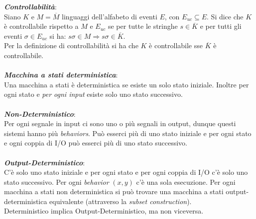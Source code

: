 \documentclass[a4paper, notitlepage, 10pt]{report}
\begin{document}
\noindent
\textit{\textbf{Controllabilità}}:\\
Siano $K$ e $M = \overline{M}$ linguaggi dell'alfabeto di eventi $E$, con $E_{uc} \subseteq E$. Si dice che $K$ è controllabile rispetto a $M$ e $E_{uc}$ se per tutte le stringhe $s \in \overline{K}$ e per tutti gli eventi $\sigma \in E_{uc}$ si ha: $s\sigma \in M \Rightarrow s \sigma \in \overline{K}$.\\Per la definizione di controllabilità si ha che $K$ è controllabile sse $\overline{K}$ è controllabile.
\\\\
\textit{\textbf{Macchina a stati deterministica}}:\\
Una macchina a stati è deterministica se esiste un solo stato iniziale. Inoltre per ogni stato e \textit{per ogni input} esiste solo uno stato successivo.
\\\\
\textit{\textbf{Non-Deterministico}}:\\
Per ogni segnale in input ci sono uno o più segnali in output, dunque questi sistemi hanno più \textit{behaviors}.
Può esserci più di uno stato iniziale e per ogni stato e ogni coppia di I/O può esserci più di uno stato successivo.
\\\\
\textit{\textbf{Output-Deterministico}}:\\
C'è solo uno stato iniziale e per ogni stato e per ogni coppia di I/O c'è solo uno stato successivo. Per ogni \textit{behavior} $(x,y)$ c'è una sola esecuzione. Per ogni macchina a stati non deterministica si può trovare una macchina a stati output-deterministica equivalente (attraverso la \textit{subset construction}).\\
Deterministico implica Output-Deterministico, ma non viceversa.
\end{document}
